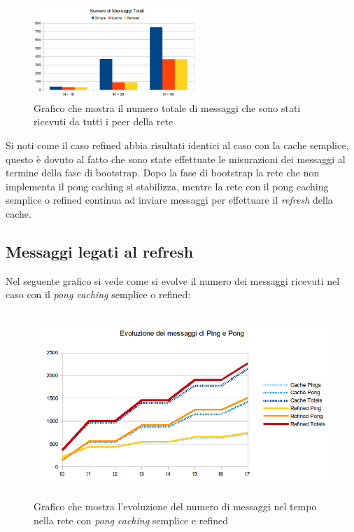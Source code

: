 \documentclass[a4paper,11pt]{article}
\begin{document}
\begin{figure}[ht]
\centering
\includegraphics[height=3.5cm]{graph2total.png}

\caption{\small{Grafico che mostra il numero totale di messaggi che sono stati ricevuti da tutti i peer della rete}}
\end{figure}

Si noti come il caso refined abbia risultati identici al caso con la cache semplice, questo \`e dovuto al fatto che sono state effettuate le misurazioni dei messaggi al termine della fase di bootstrap. Dopo la fase di bootstrap la rete che non implementa il pong caching si stabilizza, mentre la rete con il pong caching semplice o refined continua ad inviare messaggi per effettuare il \emph{refresh} della cache.

\subsection{Messaggi legati al refresh}

Nel seguente grafico si vede come si evolve il numero dei messaggi ricevuti nel caso con il \emph{pong caching} semplice o refined: 

\begin{figure}[ht]
\centering
\includegraphics[height=7cm]{graph3.png}

\caption{\small{Grafico che mostra l'evoluzione del numero di messaggi nel tempo nella rete con \emph{pong caching} semplice e refined}}
\end{figure}
\end{document}
